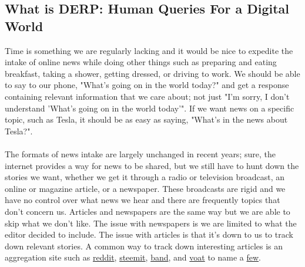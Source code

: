 \documentclass{article}
\begin{document}
\subsection{What is DERP: Human Queries For a Digital World}\label{sec:whatisDERP}
Time is something we are regularly lacking and it would be nice to expedite the intake of online news while doing other things such as preparing and eating breakfast, taking a shower, getting dressed, or driving to work. We should be able to say to our phone, "What's going on in the world today?" and get a response containing relevant information that we care about; not just "I'm sorry, I don't understand 'What's going on in the world today'". If we want news on a specific topic, such as Tesla, it should be as easy as saying, "What's in the news about Tesla?". \\ \\
The formats of news intake are largely unchanged in recent years; sure, the internet provides a way for news to be shared, but we still have to hunt down the stories we want, whether we get it through a radio or television broadcast, an online or magazine article, or a newspaper. These broadcasts are rigid and we have no control over what news we hear and there are frequently topics that don't concern us. Articles and newspapers are the same way but we are able to skip what we don't like. The issue with newspapers is we are limited to what the editor decided to include. The issue with articles is that it's down to us to track down relevant stories. A common way to track down interesting articles is an aggregation site such as \href{https://www.reddit.com}{reddit}, \href{https://steemit.com/}{steemit}, \href{https://band.us/home}{band}, and \href{https://voat.co/}{voat} to name a \href{https://www.reddit.com/r/RedditAlternatives/comments/8585ox/list_of_active_reddit_alternatives/}{few}.
\end{document}

